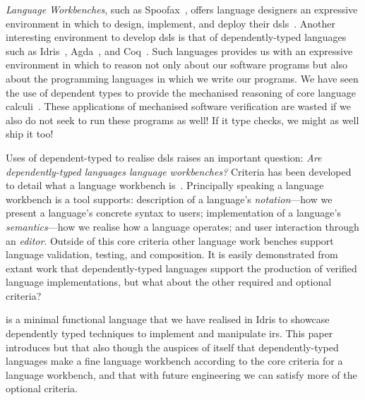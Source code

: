 \emph{Language Workbenches}, such as Spoofax~\cite{DBLP:journals/software/WachsmuthKV14}, offers language designers an expressive environment in which to design, implement, and deploy their \Acp{dsl}~\cite{hudak1996building}.
Another interesting environment to develop \acp{dsl} is that of dependently-typed languages such as Idris~\cite{DBLP:conf/ecoop/Brady21}, Agda~\cite{DBLP:conf/afp/Norell08}, and Coq~\cite{}.
Such languages provides us with an expressive environment in which to reason not only about our software programs but also about the programming languages in which we write our programs.
We have seen the use of dependent types to provide the mechanised reasoning of core language calculi~\cite{10.1145/3093333.3009866,DBLP:conf/cpp/RouvoetPKV20,DBLP:conf/mpc/ChapmanKNW19}.
These applications of mechanised software verification are wasted if we also do not seek to run these programs as well!
If it type checks, we might as well ship it too!

Uses of dependent-typed to realise \acp{dsl} raises an important question:
\emph{Are dependently-typed languages language workbenches?}
Criteria has been developed to detail what a language workbench is~\cite{DBLP:conf/sle/ErdwegSVBBCGHKLKMPPSSSVVVWW13}.
Principally speaking a language workbench is a tool supports:
description of a language's \emph{notation}---how we present a language's concrete syntax to users;
implementation of a language's \emph{semantics}---how we realise how a language operates;
and
user interaction through an \emph{editor}.
Outside of this core criteria other language work benches support language validation, testing, and composition.
It is easily demonstrated from extant work that dependently-typed languages support the production of verified language implementations, but what about the other required and optional criteria?


\Velo{} is a minimal functional language that we have realised in Idris to showcase dependently typed techniques to implement and manipulate \acp{ir}.
This paper introduces \Velo{} but that also though the auspices of \Velo{} itself that dependently-typed languages make a fine language workbench according to the core criteria for a language workbench, and that with future engineering we can satisfy more of the optional criteria.



